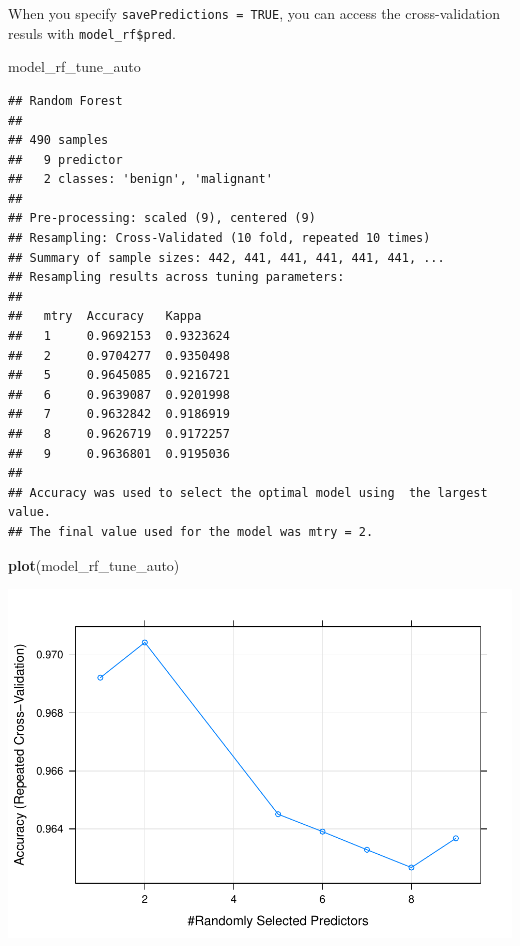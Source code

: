 \documentclass[]{article}
\newenvironment{Shaded}{\begin{snugshade}}{\end{snugshade}}
\newcommand{\KeywordTok}[1]{\textcolor[rgb]{0.13,0.29,0.53}{\textbf{{#1}}}}
\newcommand{\NormalTok}[1]{{#1}}
\begin{document}
When you specify \texttt{savePredictions\ =\ TRUE}, you can access the
cross-validation resuls with \texttt{model\_rf\$pred}.

\begin{Shaded}
\begin{Highlighting}[]
\NormalTok{model_rf_tune_auto}
\end{Highlighting}
\end{Shaded}

\begin{verbatim}
## Random Forest 
## 
## 490 samples
##   9 predictor
##   2 classes: 'benign', 'malignant' 
## 
## Pre-processing: scaled (9), centered (9) 
## Resampling: Cross-Validated (10 fold, repeated 10 times) 
## Summary of sample sizes: 442, 441, 441, 441, 441, 441, ... 
## Resampling results across tuning parameters:
## 
##   mtry  Accuracy   Kappa    
##   1     0.9692153  0.9323624
##   2     0.9704277  0.9350498
##   5     0.9645085  0.9216721
##   6     0.9639087  0.9201998
##   7     0.9632842  0.9186919
##   8     0.9626719  0.9172257
##   9     0.9636801  0.9195036
## 
## Accuracy was used to select the optimal model using  the largest value.
## The final value used for the model was mtry = 2.
\end{verbatim}

\begin{Shaded}
\begin{Highlighting}[]
\KeywordTok{plot}\NormalTok{(model_rf_tune_auto)}
\end{Highlighting}
\end{Shaded}

\includegraphics{webinar_code_files/figure-latex/unnamed-chunk-37-1.pdf}
\end{document}

